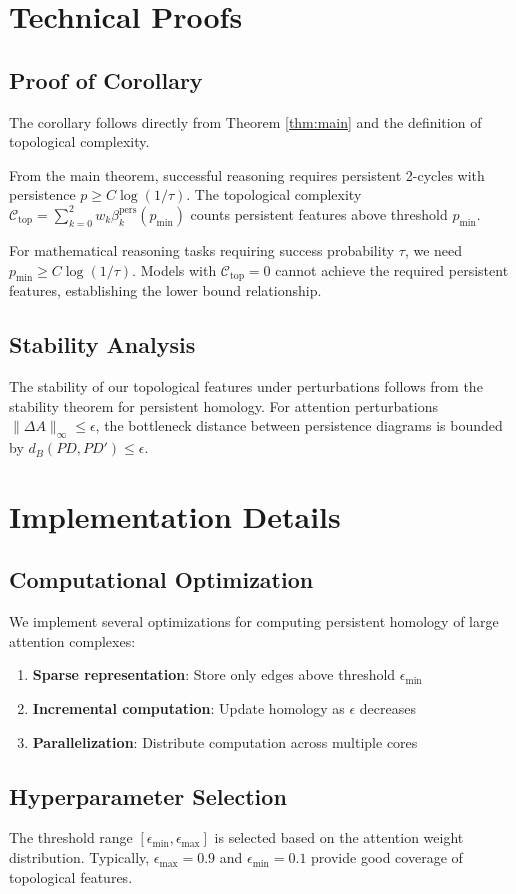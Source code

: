 \documentclass[11pt,a4paper]{article}
\begin{document}
\appendix

\section{Technical Proofs}

\subsection{Proof of Corollary}

The corollary follows directly from Theorem \ref{thm:main} and the definition of topological complexity.

From the main theorem, successful reasoning requires persistent 2-cycles with persistence $p \geq C \log(1/\tau)$. The topological complexity $\mathcal{C}_{\text{top}} = \sum_{k=0}^2 w_k \beta_k^{\text{pers}}(p_{\min})$ counts persistent features above threshold $p_{\min}$.

For mathematical reasoning tasks requiring success probability $\tau$, we need $p_{\min} \geq C \log(1/\tau)$. Models with $\mathcal{C}_{\text{top}} = 0$ cannot achieve the required persistent features, establishing the lower bound relationship.

\subsection{Stability Analysis}

The stability of our topological features under perturbations follows from the stability theorem for persistent homology. For attention perturbations $\|\Delta A\|_\infty \leq \epsilon$, the bottleneck distance between persistence diagrams is bounded by $d_B(PD, PD') \leq \epsilon$.

\section{Implementation Details}

\subsection{Computational Optimization}

We implement several optimizations for computing persistent homology of large attention complexes:

\begin{enumerate}
\item \textbf{Sparse representation}: Store only edges above threshold $\epsilon_{\min}$
\item \textbf{Incremental computation}: Update homology as $\epsilon$ decreases
\item \textbf{Parallelization}: Distribute computation across multiple cores
\end{enumerate}

\subsection{Hyperparameter Selection}

The threshold range $[\epsilon_{\min}, \epsilon_{\max}]$ is selected based on the attention weight distribution. Typically, $\epsilon_{\max} = 0.9$ and $\epsilon_{\min} = 0.1$ provide good coverage of topological features.
\end{document}
